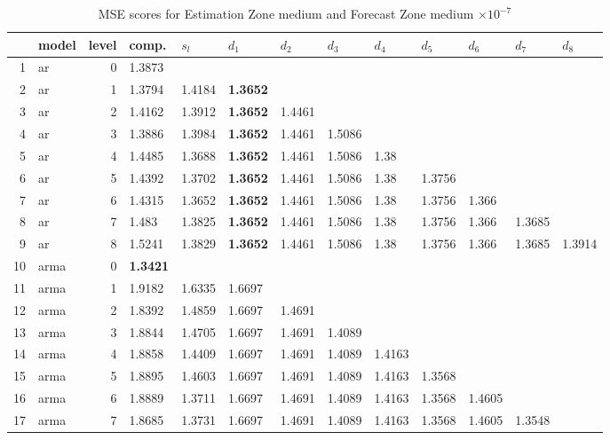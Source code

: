 \documentclass[10pt,a4paper]{article}
\begin{document}
\begin{table}[ht]
\centering
\caption{MSE scores for Estimation Zone medium and Forecast Zone medium $ \times 10^{-7}$} 
\begin{tabular}{rlrllllllllll}
  \hline
 & model & level & comp. & $s_l$ & $d_1$ & $d_2$ & $d_3$ & $d_4$ & $d_5$ & $d_6$ & $d_7$ & $d_8$ \\ 
  \hline
1 & ar &     0 & 1.3873 &  &  &  &  &  &  &  &  &  \\ 
  2 & ar &     1 & 1.3794 & 1.4184 & \textbf{1.3652} &  &  &  &  &  &  &  \\ 
  3 & ar &     2 & 1.4162 & 1.3912 & \textbf{1.3652} & 1.4461 &  &  &  &  &  &  \\ 
  4 & ar &     3 & 1.3886 & 1.3984 & \textbf{1.3652} & 1.4461 & 1.5086 &  &  &  &  &  \\ 
  5 & ar &     4 & 1.4485 & 1.3688 & \textbf{1.3652} & 1.4461 & 1.5086 & 1.38 &  &  &  &  \\ 
  6 & ar &     5 & 1.4392 & 1.3702 & \textbf{1.3652} & 1.4461 & 1.5086 & 1.38 & 1.3756 &  &  &  \\ 
  7 & ar &     6 & 1.4315 & 1.3652 & \textbf{1.3652} & 1.4461 & 1.5086 & 1.38 & 1.3756 & 1.366 &  &  \\ 
  8 & ar &     7 & 1.483 & 1.3825 & \textbf{1.3652} & 1.4461 & 1.5086 & 1.38 & 1.3756 & 1.366 & 1.3685 &  \\ 
  9 & ar &     8 & 1.5241 & 1.3829 & \textbf{1.3652} & 1.4461 & 1.5086 & 1.38 & 1.3756 & 1.366 & 1.3685 & 1.3914 \\ 
   \hline
10 & arma &     0 & \textbf{1.3421} &  &  &  &  &  &  &  &  &  \\ 
  11 & arma &     1 & 1.9182 & 1.6335 & 1.6697 &  &  &  &  &  &  &  \\ 
  12 & arma &     2 & 1.8392 & 1.4859 & 1.6697 & 1.4691 &  &  &  &  &  &  \\ 
  13 & arma &     3 & 1.8844 & 1.4705 & 1.6697 & 1.4691 & 1.4089 &  &  &  &  &  \\ 
  14 & arma &     4 & 1.8858 & 1.4409 & 1.6697 & 1.4691 & 1.4089 & 1.4163 &  &  &  &  \\ 
  15 & arma &     5 & 1.8895 & 1.4603 & 1.6697 & 1.4691 & 1.4089 & 1.4163 & 1.3568 &  &  &  \\ 
  16 & arma &     6 & 1.8889 & 1.3711 & 1.6697 & 1.4691 & 1.4089 & 1.4163 & 1.3568 & 1.4605 &  &  \\ 
  17 & arma &     7 & 1.8685 & 1.3731 & 1.6697 & 1.4691 & 1.4089 & 1.4163 & 1.3568 & 1.4605 & 1.3548 &  \\ 

\end{tabular}
\end{table}
\end{document}
